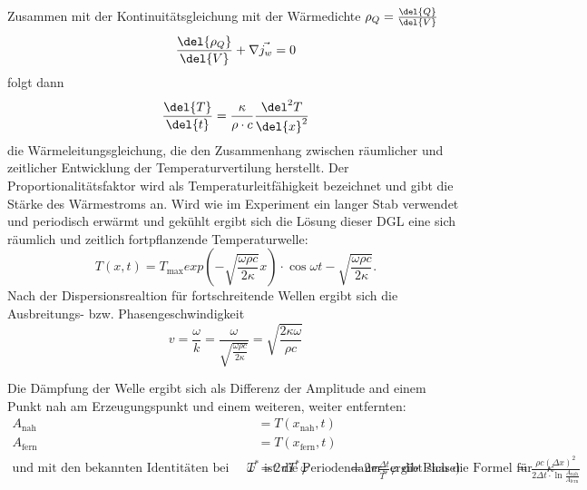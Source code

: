 Zusammen mit der Kontinuitätsgleichung mit der Wärmedichte $\rho_Q = \frac{\del{Q}}{\del{V}}$
\begin{equation}
  \frac{\del{\rho_Q}}{\del{V}}+\nabla \vec{j_w} = 0
\end{equation}
folgt dann 
\begin{equation}
  \frac{\del{T}}{\del{t}} = \frac{\kappa}{\rho\cdot c}\frac{\del^2{T}}{\del{x}^2}
\end{equation}
die Wärmeleitungsgleichung, die den Zusammenhang zwischen räumlicher und zeitlicher Entwicklung der Temperaturvertilung herstellt.
Der Proportionalitätsfaktor wird als Temperaturleitfähigkeit bezeichnet und gibt die Stärke des Wärmestroms an. 
Wird wie im Experiment ein langer Stab verwendet und periodisch erwärmt und gekühlt ergibt sich die Lösung dieser DGL eine sich räumlich und zeitlich fortpflanzende Temperaturwelle:
\begin{equation}
  T(x,t) = T_{\text{max}}exp(-\sqrt{\frac{\omega\rho c}{2\kappa}}x) \cdot \cos{\omega t -\sqrt{\frac{\omega\rho c}{2\kappa}}}.
\end{equation}
Nach der Dispersionsrealtion für fortschreitende Wellen ergibt sich die Ausbreitungs- bzw. Phasengeschwindigkeit
\begin{equation}
  v = \frac{\omega}{k} = \frac{\omega}{\sqrt{\frac{\omega\rho c}{2\kappa}}} = \sqrt{\frac{2\kappa\omega}{\rho c}}
\end{equation}

Die Dämpfung der Welle ergibt sich als Differenz der Amplitude and einem Punkt nah am Erzeugungspunkt und einem weiteren, weiter entfernten:
\begin{align}
  A_{\text{nah}} &= T(x_{\text{nah}},t) \\
  A_{\text{fern}} &= T(x_{\text{fern}},t)\\
  \text{und mit den bekannten Identitäten bei periodischem Verhalten($T^*$ ist die Periodendauer, $\varphi$ die Phase)}
  \omega &= 2\pi T^*
  \varphi&= 2\pi \frac{\Delta t}{T^*}
  \text{ergibt sich die Formel für die Wärmeleitfähigkeit}
  \kappa &= \frac{\rho c (\Delta x)^2}{2\Delta t\cdot \ln{\frac{A_{\text{nah}}}{A_{\text{fern}}}}}
\end{align}








